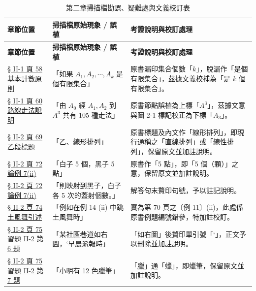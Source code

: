 \documentclass[a4paper,12pt,twoside]{article}
\begin{document}
\small
\renewcommand{\arraystretch}{1.35}
\begin{xltabular}{\textwidth}{|p{3.2cm}|p{3.8cm}|X|}
\caption{第二章掃描檔勘誤、疑難處與文義校訂表}\label{tab:errata_b5_ch2} \\
\hline
\textbf{章節位置} & \textbf{掃描檔原始現象 / 誤植} & \textbf{考證說明與校訂處理} \\ \hline
\endfirsthead
\hline
\textbf{章節位置} & \textbf{掃描檔原始現象 / 誤植} & \textbf{考證說明與校訂處理} \\ \hline
\endhead
\hline
\endfoot

\hyperref[note:b5-ch2-p58-k]{§ II-1 頁 58 基本計數原則} & 
「如果 $A_1, A_2, \cdots, A_k$ 是個有限集合」 & 
原書漏印集合個數「$k$」，脫漏作「是個有限集合」，茲據文義校補為「是 $k$ 個有限集合」。 \\ \hline

\hyperref[note:b5-ch2-p60-a3]{§ II-1 頁 60 路線走法說明} & 
「由 $A_0$ 經 $A_1, A_2$ 到 $A^3$ 共有 105 種走法」 & 
原書節點誤植為上標「$A^3$」，茲據文意與圖 2-1 標記校正為下標「$A_3$」。 \\ \hline

\hyperref[note:b5-ch2-linear-perm]{§ II-2 頁 69 乙段標題} & 
「乙、線形排列」 & 
原書標題及內文作「線形排列」，即現行通稱之「直線排列」或「線性排列」，保留原文並加註說明。 \\ \hline

\hyperref[note:b5-ch2-p72-go-stones]{§ II-2 頁 72 論例 7(ii)} & 
「白子 5 個，黑子 5 點」 & 
原書作「5 點」，即「5 個（顆）」之意，保留原文並加註說明。 \\ \hline

\hyperref[note:b5-ch2-p72-surjection-period]{§ II-2 頁 72 論例 7(ii)} & 
「則映射到黑子，白子各 5 次的蓋射個數。」 & 
解答句末贅印句號，予以註記說明。 \\ \hline

\hyperref[note:b5-ch2-p74-ex14]{§ II-2 頁 74 土風舞引述} & 
「例如在例 14 (ii) 中跳土風舞時」 & 
實為第 70 頁之〔例 11〕(ii)，此處係原書例題編號錯參，特加註校訂。 \\ \hline

\hyperref[note:b5-ch2-p75-q6-quote]{§ II-2 頁 75 習題 II-2 第 6 題} & 
「某社區巷道如右圖，‘早晨派報時」 & 
「如右圖」後贅印單引號「‘」，正文予以刪除並加註說明。 \\ \hline

\hyperref[note:b5-ch2-p75-q7-crayon]{§ II-2 頁 75 習題 II-2 第 7 題} & 
「小明有 12 色臘筆」 & 
「臘」通「蠟」，即蠟筆，保留原文並加註說明。 \\ \hline


\end{xltabular}
\end{document}
